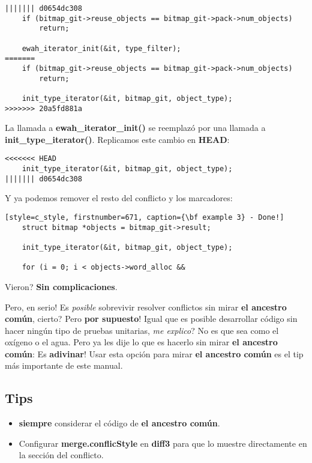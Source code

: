 \begin{lstlisting}[style=c_style, firstnumber=675, caption={\bf Ejemplo 3} - Paso 2]
||||||| d0654dc308
	if (bitmap_git->reuse_objects == bitmap_git->pack->num_objects)
		return;

	ewah_iterator_init(&it, type_filter);
=======
	if (bitmap_git->reuse_objects == bitmap_git->pack->num_objects)
		return;

	init_type_iterator(&it, bitmap_git, object_type);
>>>>>>> 20a5fd881a
\end{lstlisting}

La llamada a {\bf ewah\_iterator\_init()} se reemplazó por una llamada a {\bf init\_type\_iterator()}. Replicamos
este cambio en {\bf HEAD}:

\begin{lstlisting}[style=c_style, firstnumber=673, caption={\bf Ejemplo 3} - Paso 3]
<<<<<<< HEAD
	init_type_iterator(&it, bitmap_git, object_type);
||||||| d0654dc308
\end{lstlisting}

Y ya podemos remover el resto del conflicto y los marcadores:

\begin{lstlisting}[style=c_style, firstnumber=671, caption={\bf example 3} - Done!]
	struct bitmap *objects = bitmap_git->result;

	init_type_iterator(&it, bitmap_git, object_type);

	for (i = 0; i < objects->word_alloc &&
\end{lstlisting}

Vieron? {\bf Sin complicaciones}.

Pero, en serio! Es {\it posible} sobrevivir resolver conflictos sin mirar {\bf el ancestro común}, cierto?
Pero {\bf por supuesto}! Igual que es posible desarrollar código sin hacer ningún tipo de pruebas unitarias, {\it me
explico}? No es que sea como el oxígeno o el agua. Pero ya les dije lo que es hacerlo sin mirar {\bf el ancestro común}:
Es {\bf adivinar}! Usar esta opción para mirar {\bf el ancestro común} es el tip más importante de este manual.

\subsection{Tips}
\begin{itemize}
	\item {\bf siempre} considerar el código de {\bf el ancestro común}.
	\item Configurar {\bf merge.conflicStyle} en {\bf diff3} para que lo muestre directamente en la sección del conflicto.
\end{itemize}

